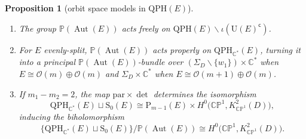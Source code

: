 \documentclass[10pt,a4paper]{amsart}
\newcommand{\field}[1]{\ensuremath{\mathbb{#1}}}
\newcommand{\CC}{\field{C}}
\newcommand{\PP}{\field{P}}
\newcommand{\calO}{\mathcal{O}}
\DeclareMathOperator{\Aut}{Aut}
\numberwithin{equation}{section}
\newtheorem{Proposition}[Theorem]{Proposition}
 { \theoremstyle{definition}
\newtheorem{Definition}[Theorem]{Definition}
\newtheorem{Note}[Theorem]{Note}
\newtheorem{Example}[Theorem]{Example}
\newtheorem{Remark}[Theorem]{Remark} }
\begin{document}
{\samepage\begin{Proposition}[orbit space models in $\mathrm{QPH}(E)$]\label{prop:orbit-bulk}\quad
\begin{enumerate}\itemsep=0pt
\item[$(i)$] The group $\PP(\Aut(E))$ acts freely on $\mathrm{QPH}(E)\backslash\iota(\mathrm{U}(E)^{\mathsf{c}})$.
\item[$(ii)$] For $E$ evenly-split, $\PP(\Aut(E))$ acts properly on
$\mathrm{QPH}_{\CC^{*}}(E)$, turning it into a principal $\PP(\Aut(E))$-bundle over $(\Sigma_{D}\backslash\{w_{1}\})\times \CC^{*}$ when $E\cong\calO(m)\oplus\calO(m)$ and $\Sigma_{D}\times \CC^{*}$ when $E\cong\calO(m+1)\oplus\calO(m)$.
\item[$(iii)$] If $m_{1}-m_{2}=2$, the map $\mathrm{par}\times \det$ determines the isomorphism
\[
\mathrm{QPH}_{\CC^{*}}(E)\sqcup \mathrm{S}_{0}(E)\cong\mathrm{P}_{m-1}(E)\times H^{0}\bigl(\CC\PP^{1},K_{\CC\PP^{1}}^{2}(D)\bigr),
\]
inducing the biholomorphism
\[
\bigl\{\mathrm{QPH}_{\CC^{*}}(E)\sqcup \mathrm{S}_{0}(E)\bigr\}/\PP(\Aut(E))\cong H^{0}\bigl(\CC\PP^{1},K_{\CC\PP^{1}}^{2}(D)\bigr).
\]
\end{enumerate}
\end{Proposition}}
\end{document}
